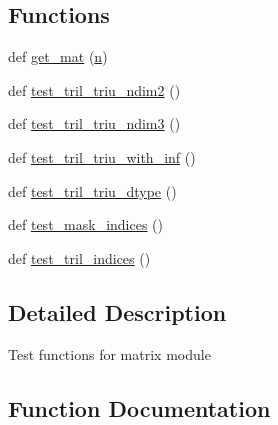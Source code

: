 \subsection*{Functions}
\begin{DoxyCompactItemize}
\item 
def \hyperlink{namespacenumpy_1_1lib_1_1tests_1_1test__twodim__base_a2a34e3b189f89d20c3fdfc20252d7e46}{get\+\_\+mat} (\hyperlink{namespacenumpy_a352663c52853d2754274407d5cae2832}{n})
\item 
def \hyperlink{namespacenumpy_1_1lib_1_1tests_1_1test__twodim__base_a5d18acb59b00420f309405248e892dfe}{test\+\_\+tril\+\_\+triu\+\_\+ndim2} ()
\item 
def \hyperlink{namespacenumpy_1_1lib_1_1tests_1_1test__twodim__base_a99a49d162308934491f01f8a04f9f779}{test\+\_\+tril\+\_\+triu\+\_\+ndim3} ()
\item 
def \hyperlink{namespacenumpy_1_1lib_1_1tests_1_1test__twodim__base_a2356ff24dc28e3874da3103a6ecd177b}{test\+\_\+tril\+\_\+triu\+\_\+with\+\_\+inf} ()
\item 
def \hyperlink{namespacenumpy_1_1lib_1_1tests_1_1test__twodim__base_af86e7eac23d2497f87339fc45f2a3172}{test\+\_\+tril\+\_\+triu\+\_\+dtype} ()
\item 
def \hyperlink{namespacenumpy_1_1lib_1_1tests_1_1test__twodim__base_a76190003792c574303825dc953cfb6f2}{test\+\_\+mask\+\_\+indices} ()
\item 
def \hyperlink{namespacenumpy_1_1lib_1_1tests_1_1test__twodim__base_a7d36b7743b66415b7ca9e725a337ec59}{test\+\_\+tril\+\_\+indices} ()
\end{DoxyCompactItemize}


\subsection{Detailed Description}
\begin{DoxyVerb}Test functions for matrix module\end{DoxyVerb}
 

\subsection{Function Documentation}
\mbox{\label{namespacenumpy_1_1lib_1_1tests_1_1test__twodim__base_a2a34e3b189f89d20c3fdfc20252d7e46}} 
